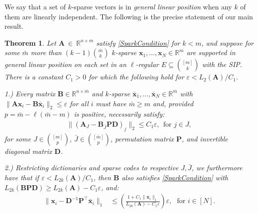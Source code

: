 \documentclass[9pt,twocolumn]{pnas-new}
\newtheorem{theorem}{Theorem}
\begin{document}
We say that a set of $k$-sparse vectors is in \emph{general linear position} when any $k$ of them are linearly independent.
The following is the precise statement of our main result. 

\begin{theorem}\label{DeterministicUniquenessTheorem}
Let $\mathbf{A}~\in~\mathbb{R}^{n \times m}$ satisfy \eqref{SparkCondition} for $k < m$, and suppose for some $\bar m$ more than \mbox{$(k-1){\bar m \choose k}$} $k$-sparse \mbox{$\mathbf{x}_1, \ldots, \mathbf{x}_N \in \mathbb{R}^m$} are supported in general linear position on each set in an $\ell$-regular $E \subseteq {[m] \choose k}$ with the SIP.  There is a constant $C_1 > 0$ for which the following hold for $\varepsilon < L_2(\mathbf{A}) / C_1$.

1.) Every matrix $\mathbf{B} \in \mathbb{R}^{n \times \bar m}$ and $k$-sparse $\mathbf{\bar x}_1, \ldots, \mathbf{\bar x}_N \in \mathbb{R}^{\bar m}$ with  \mbox{$\|\mathbf{A}\mathbf{x}_i - \mathbf{B}\mathbf{\bar x}_i\|_2 \leq \varepsilon$} for all $i$ must have $\bar m \geq m$ and, provided $p = \bar m - \ell(\bar m - m)$ is positive, necessarily satisfy:
\begin{align}\label{Cstable}
\|(\mathbf{A}_J- \mathbf{B}_{\bar J} \mathbf{PD} )_j\|_2 \leq C_1 \varepsilon, \ \  \text{for $j \in J$},
\end{align}
for some $J \in {[m] \choose p}$, $\bar J \in {[\bar m] \choose p}$, permutation matrix $\mathbf{P}$, and invertible diagonal matrix $\mathbf{D}$.

2.) Restricting dictionaries and sparse codes to respective $J, \bar{J}$, we furthermore have that if $\varepsilon < L_{2k}(\mathbf{A}) / C_1$, then $\mathbf{B}$ also satisfies \eqref{SparkCondition} with $L_{2k}(\mathbf{B}\mathbf{PD}) \geq L_{2k}(\mathbf{A}) - C_1 \varepsilon$, and:
\begin{align}\label{b-PDa}
\|\mathbf{x}_i - \mathbf{D}^{-1}\mathbf{P}^{\top}\mathbf{\bar x}_i\|_1 &\leq  \left( \frac{ 1+C_1 \|\mathbf{x}_i\|_1 }{ L_{2k}(\mathbf{A}) -  C_1\varepsilon } \right) \varepsilon,\ \ \   \text{for $i \in [N]$}.
\end{align}
\end{theorem}

\end{document}
